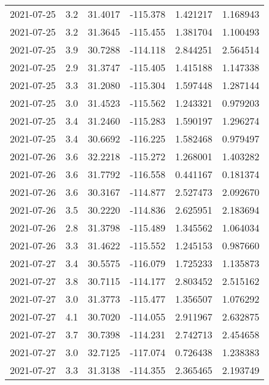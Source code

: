 \begin{tabular}{lrrrrr}
2021-07-25 &       3.2 &  31.4017 &  -115.378 &         1.421217 &         1.168943 \\
2021-07-25 &       3.2 &  31.3645 &  -115.455 &         1.381704 &         1.100493 \\
2021-07-25 &       3.9 &  30.7288 &  -114.118 &         2.844251 &         2.564514 \\
2021-07-25 &       2.9 &  31.3747 &  -115.405 &         1.415188 &         1.147338 \\
2021-07-25 &       3.3 &  31.2080 &  -115.304 &         1.597448 &         1.287144 \\
2021-07-25 &       3.0 &  31.4523 &  -115.562 &         1.243321 &         0.979203 \\
2021-07-25 &       3.4 &  31.2460 &  -115.283 &         1.590197 &         1.296274 \\
2021-07-25 &       3.4 &  30.6692 &  -116.225 &         1.582468 &         0.979497 \\
2021-07-26 &       3.6 &  32.2218 &  -115.272 &         1.268001 &         1.403282 \\
2021-07-26 &       3.6 &  31.7792 &  -116.558 &         0.441167 &         0.181374 \\
2021-07-26 &       3.6 &  30.3167 &  -114.877 &         2.527473 &         2.092670 \\
2021-07-26 &       3.5 &  30.2220 &  -114.836 &         2.625951 &         2.183694 \\
2021-07-26 &       2.8 &  31.3798 &  -115.489 &         1.345562 &         1.064034 \\
2021-07-26 &       3.3 &  31.4622 &  -115.552 &         1.245153 &         0.987660 \\
2021-07-27 &       3.4 &  30.5575 &  -116.079 &         1.725233 &         1.135873 \\
2021-07-27 &       3.8 &  30.7115 &  -114.177 &         2.803452 &         2.515162 \\
2021-07-27 &       3.0 &  31.3773 &  -115.477 &         1.356507 &         1.076292 \\
2021-07-27 &       4.1 &  30.7020 &  -114.055 &         2.911967 &         2.632875 \\
2021-07-27 &       3.7 &  30.7398 &  -114.231 &         2.742713 &         2.454658 \\
2021-07-27 &       3.0 &  32.7125 &  -117.074 &         0.726438 &         1.238383 \\
2021-07-27 &       3.3 &  31.3138 &  -114.355 &         2.365465 &         2.193749 \\

\end{tabular}

